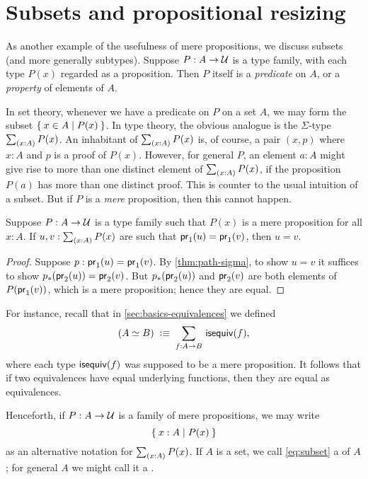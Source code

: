 \section{Subsets and propositional resizing}
\label{subsec:prop-subsets}

As another example of the usefulness of mere propositions, we discuss subsets (and more generally subtypes).
Suppose $P:A\to\mathcal{U}$ is a type family, with each type $P(x)$ regarded as a proposition.
Then $P$ itself is a \emph{predicate} on $A$, or a \emph{property} of elements of $A$.

In set theory, whenever we have a predicate on $P$ on a set $A$, we may form the subset $\Set{x\in A | P(x)}$.
In type theory, the obvious analogue is the $\Sigma$-type $\sm{x:A} P(x)$.
An inhabitant of $\sm{x:A} P(x)$ is, of course, a pair $(x,p)$ where $x:A$ and $p$ is a proof of $P(x)$.
However, for general $P$, an element $a:A$ might give rise to more than one distinct element of $\sm{x:A} P(x)$, if the proposition $P(a)$ has more than one distinct proof.
This is counter to the usual intuition of a subset.
But if $P$ is a \emph{mere} proposition, then this cannot happen.

\begin{lem}\label{thm:path-subset}
  Suppose $P:A\to\mathcal{U}$ is a type family such that $P(x)$ is a mere proposition for all $x:A$.
  If $u,v:\sm{x:A} P(x)$ are such that $\mathsf{pr}_{1}(u) = \mathsf{pr}_{1}(v)$, then $u=v$.
\end{lem}
\begin{proof}
  Suppose $p:\mathsf{pr}_{1}(u) = \mathsf{pr}_{1}(v)$.
  By \autoref{thm:path-sigma}, to show $u=v$ it suffices to show ${p}_{*}\mathopen{}\left({\mathsf{pr}_{2}(u)}\right)\mathclose{} = \mathsf{pr}_{2}(v)$.
  But ${p}_{*}\mathopen{}\left({\mathsf{pr}_{2}(u)}\right)\mathclose{}$ and $\mathsf{pr}_{2}(v)$ are both elements of $P(\mathsf{pr}_{1}(v))$, which is a mere proposition; hence they are equal.
\end{proof}

For instance, recall that in \autoref{sec:basics-equivalences} we defined
\[(\eqv A B) \;\defeq\; \sm{f:A\to B} \isequiv (f),\]
where each type $\mathsf{isequiv} (f)$ was supposed to be a mere proposition.
It follows that if two equivalences have equal underlying functions, then they are equal as equivalences.

\label{defn:setof}%
Henceforth, if $P:A\to \mathcal{U}$ is a family of mere propositions, we may write
%
\begin{equation}
  \label{eq:subset}
  \setof{x:A | P(x)}
\end{equation}
%
as an alternative notation for $\sm{x:A} P(x)$.
If $A$ is a set, we call \eqref{eq:subset} a  of $A$; for general $A$ we might call it a .

